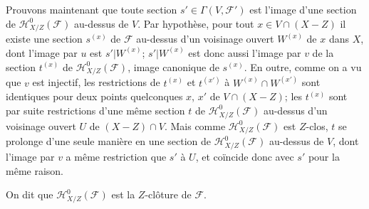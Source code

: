 \documentclass[10pt,oneside]{book}
\newcommand{\oldpage}[2][]{%
  \setcounter{footnote}{0}%
  \marginpar{\scriptsize\textbf{#1}~|~#2}\ignorespaces}
\begin{document}
Prouvons maintenant que toute section $s'\in\Gamma(V,\mathcal F')$ est
l'image d'une section de $\mathcal H^0_{X/Z}(\mathcal F)$ au-dessus de $V$.
Par hypothèse, pour tout $x\in V\cap(X-Z)$ il existe une section $s^{(x)}$
de $\mathcal F$ au-dessus d'un voisinage ouvert $W^{(x)}$ de $x$ dans $X$,
dont l'image par $u$ est $s'|W^{(x)}$; $s'|W^{(x)}$ est donc aussi l'image
par $v$ de la section $t^{(x)}$ de $\mathcal H^0_{X/Z}(\mathcal F)$, image
canonique de $s^{(x)}$. En outre, comme on a vu que $v$ est injectif, les
restrictions de $t^{(x)}$ et $t^{(x')}$ à $W^{(x)}\cap W^{(x')}$ sont
identiques pour deux points quelconques $x$, $x'$ de $V\cap(X-Z)$; les
$t^{(x)}$ sont par suite restrictions d'une même section $t$ de
$\mathcal H^0_{X/Z}(\mathcal F)$ au-dessus d'un voisinage ouvert $U$ de
$(X-Z)\cap V$. Mais comme $\mathcal H^0_{X/Z}(\mathcal F)$ est $Z$-clos,
$t$ se prolonge d'une seule manière en une section de
$\mathcal H^0_{X/Z}(\mathcal F)$ au-dessus de $V$, dont l'image par $v$ a
même restriction que $s'$ à $U$, et coïncide donc avec $s'$ pour la même
raison.

On dit que $\mathcal H^0_{X/Z}(\mathcal F)$ est la $Z$-clôture de
$\mathcal F$.

\oldpage[IV-2]{114}
\end{document}
